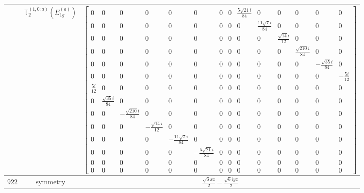\documentclass[fleqn,8pt,landscape]{jsarticle}
\begin{document}
\begin{longtable}{ccc}
$  $ & $ \mathbb{T}_{2}^{(1,0;a)}(E_{1g}^{(a)}) $ & $ \begin{bmatrix} 0 & 0 & 0 & 0 & 0 & 0 & 0 & 0 & \frac{5 \sqrt{21} i}{84} & 0 & 0 & 0 & 0 & 0 \\ 0 & 0 & 0 & 0 & 0 & 0 & 0 & 0 & 0 & \frac{11 \sqrt{7} i}{84} & 0 & 0 & 0 & 0 \\ 0 & 0 & 0 & 0 & 0 & 0 & 0 & 0 & 0 & 0 & \frac{\sqrt{14} i}{12} & 0 & 0 & 0 \\ 0 & 0 & 0 & 0 & 0 & 0 & 0 & 0 & 0 & 0 & 0 & \frac{\sqrt{210} i}{84} & 0 & 0 \\ 0 & 0 & 0 & 0 & 0 & 0 & 0 & 0 & 0 & 0 & 0 & 0 & - \frac{\sqrt{35} i}{84} & 0 \\ 0 & 0 & 0 & 0 & 0 & 0 & 0 & 0 & 0 & 0 & 0 & 0 & 0 & - \frac{5 i}{12} \\ \frac{5 i}{12} & 0 & 0 & 0 & 0 & 0 & 0 & 0 & 0 & 0 & 0 & 0 & 0 & 0 \\ 0 & \frac{\sqrt{35} i}{84} & 0 & 0 & 0 & 0 & 0 & 0 & 0 & 0 & 0 & 0 & 0 & 0 \\ 0 & 0 & - \frac{\sqrt{210} i}{84} & 0 & 0 & 0 & 0 & 0 & 0 & 0 & 0 & 0 & 0 & 0 \\ 0 & 0 & 0 & - \frac{\sqrt{14} i}{12} & 0 & 0 & 0 & 0 & 0 & 0 & 0 & 0 & 0 & 0 \\ 0 & 0 & 0 & 0 & - \frac{11 \sqrt{7} i}{84} & 0 & 0 & 0 & 0 & 0 & 0 & 0 & 0 & 0 \\ 0 & 0 & 0 & 0 & 0 & - \frac{5 \sqrt{21} i}{84} & 0 & 0 & 0 & 0 & 0 & 0 & 0 & 0 \\ 0 & 0 & 0 & 0 & 0 & 0 & 0 & 0 & 0 & 0 & 0 & 0 & 0 & 0 \\ 0 & 0 & 0 & 0 & 0 & 0 & 0 & 0 & 0 & 0 & 0 & 0 & 0 & 0 \end{bmatrix} $ \\ \hline
$ 922 $ & $ \text{symmetry} $ & $ \frac{\sqrt{6} x z}{2} - \frac{\sqrt{6} i y z}{2} $ \\

\end{longtable}
\end{document}

